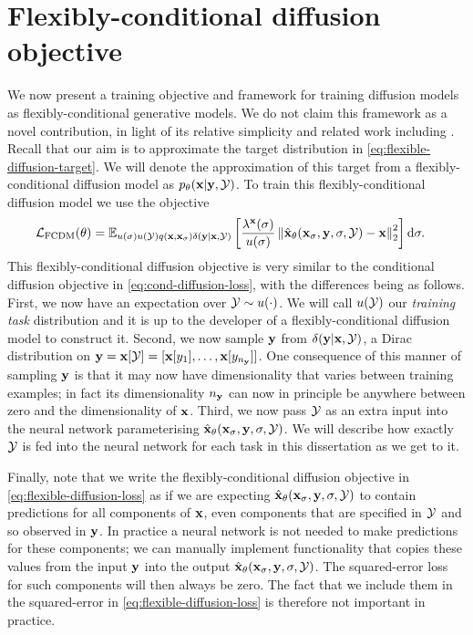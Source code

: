 \section{Flexibly-conditional diffusion objective}
We now present a training objective and framework for training diffusion models as flexibly-conditional generative models. We do not claim this framework as a novel contribution, in light of its relative simplicity and related work including \citet{tashiro2021csdi,weilbach2023graphically}. Recall that our aim is to approximate the target distribution in \cref{eq:flexible-diffusion-target}. We will denote the approximation of this target from a flexibly-conditional diffusion model as $p_\theta({\mathbf{x}}|{\mathbf{y}},{\mathcal{Y}})$. To train this flexibly-conditional diffusion model we use the objective
\begin{align} \label{eq:flexible-diffusion-loss}
    \mathcal{L}_\text{FCDM}(\theta) &= \mathbb{E}_{u(\sigma)u({\mathcal{Y}})q({\mathbf{x}}, {\mathbf{x}}_\sigma)\delta({\mathbf{y}}|{\mathbf{x}},{\mathcal{Y}})} \left[ 
    \frac{\lambda^{\mathbf{x}}(\sigma)}{u(\sigma)} \left\| \hat{{\mathbf{x}}}_\theta({\mathbf{x}}_\sigma, {\mathbf{y}}, \sigma, {\mathcal{Y}}) - {\mathbf{x}} \right\|_2^2 \right] \mathrm{d}\sigma.
\end{align}
This flexibly-conditional diffusion objective is very similar to the conditional diffusion objective in \cref{eq:cond-diffusion-loss}, with the differences being as follows. First, we now have an expectation over ${\mathcal{Y}} \sim u(\cdot)$. We will call $u({\mathcal{Y}})$ our \textit{training task} distribution and it is up to the developer of a flexibly-conditional diffusion model to construct it. Second, we now sample ${\mathbf{y}}$ from $\delta({\mathbf{y}}|{\mathbf{x}},{\mathcal{Y}})$, a Dirac distribution on ${\mathbf{y}} = {\mathbf{x}}[{\mathcal{Y}}] = [ {\mathbf{x}}[y_1], \ldots, {\mathbf{x}}[y_{n_{\mathbf{y}}}] ]$. One consequence of this manner of sampling ${\mathbf{y}}$ is that it may now have dimensionality that varies between training examples; in fact its dimensionality $n_{\mathbf{y}}$ can now in principle be anywhere between zero and the dimensionality of ${\mathbf{x}}$. Third, we now pass ${\mathcal{Y}}$ as an extra input into the neural network parameterising $\hat{{\mathbf{x}}}_\theta({\mathbf{x}}_\sigma, {\mathbf{y}}, \sigma, {\mathcal{Y}})$. We will describe how exactly ${\mathcal{Y}}$ is fed into the neural network for each task in this dissertation as we get to it.

Finally, note that we write the flexibly-conditional diffusion objective in  \cref{eq:flexible-diffusion-loss} as if we are expecting $\hat{{\mathbf{x}}}_\theta({\mathbf{x}}_\sigma, {\mathbf{y}}, \sigma, {\mathcal{Y}})$ to contain predictions for all components of ${\mathbf{x}}$, even components that are specified in ${\mathcal{Y}}$ and so observed in ${\mathbf{y}}$. In practice a neural network is not needed to make predictions for these components; we can manually implement functionality that copies these values from the input ${\mathbf{y}}$ into the output $\hat{{\mathbf{x}}}_\theta({\mathbf{x}}_\sigma, {\mathbf{y}}, \sigma, {\mathcal{Y}})$. The squared-error loss for such components will then always be zero. The fact that we include them in the squared-error in \cref{eq:flexible-diffusion-loss} is therefore not important in practice.

